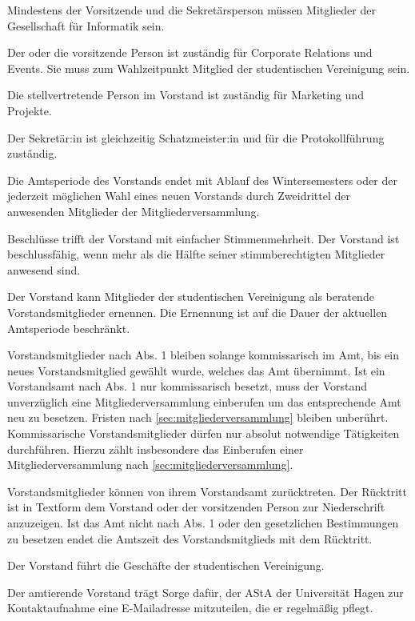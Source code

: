 \begin{contract}
Mindestens der Vorsitzende und die Sekretärsperson müssen Mitglieder der Gesellschaft für Informatik sein.

Der oder die vorsitzende Person ist zuständig für Corporate Relations und Events. Sie muss zum Wahlzeitpunkt Mitglied der studentischen Vereinigung sein.

Die stellvertretende Person im Vorstand ist zuständig für Marketing und Projekte.

Der Sekretär:in ist gleichzeitig Schatzmeister:in und für die Protokollführung zuständig.

Die Amtsperiode des Vorstands endet mit Ablauf des Wintersemesters oder der jederzeit möglichen Wahl eines neuen Vorstands durch Zweidrittel der anwesenden Mitglieder der Mitgliederversammlung. \label{sec:vorstand-VorzeitigeAbwahl}

Beschlüsse trifft der Vorstand mit einfacher Stimmenmehrheit. Der Vorstand ist beschlussfähig, wenn mehr als die Hälfte seiner stimmberechtigten Mitglieder anwesend sind.

Der Vorstand kann Mitglieder der studentischen Vereinigung als beratende Vorstandsmitglieder ernennen. Die Ernennung ist auf die Dauer der aktuellen Amtsperiode beschränkt.

Vorstandsmitglieder nach Abs. 1 bleiben solange kommissarisch im Amt, bis ein neues Vorstandsmitglied gewählt wurde, welches das Amt übernimmt. Ist ein Vorstandsamt nach Abs. 1 nur kommissarisch besetzt, muss der Vorstand unverzüglich eine Mitgliederversammlung einberufen um das entsprechende Amt neu zu besetzen. Fristen nach \ref{sec:mitgliederversammlung} bleiben unberührt. Kommissarische Vorstandsmitglieder dürfen nur absolut notwendige Tätigkeiten durchführen. Hierzu zählt insbesondere das Einberufen einer Mitgliederversammlung nach \ref{sec:mitgliederversammlung}.

Vorstandsmitglieder können von ihrem Vorstandsamt zurücktreten. Der Rücktritt ist in Textform dem Vorstand oder der vorsitzenden Person zur Niederschrift anzuzeigen. Ist das Amt nicht nach Abs. 1 oder den gesetzlichen Bestimmungen zu besetzen endet die Amtszeit des Vorstandsmitglieds mit dem Rücktritt.

\label{sec:geschäftsbereichVorstand}

Der Vorstand führt die Geschäfte der studentischen Vereinigung.

Der amtierende Vorstand trägt Sorge dafür, der AStA der Universität Hagen zur Kontaktaufnahme eine E-Mailadresse mitzuteilen, die er regelmäßig pflegt.



\end{contract}
